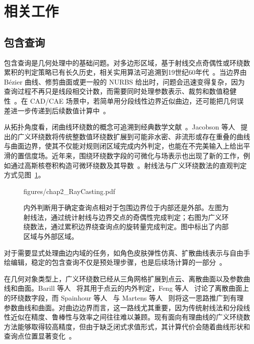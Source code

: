 \section{相关工作}\label{sec:ch2-related-work}
\subsection{包含查询}
包含查询是几何处理中的基础问题。对多边形区域，基于射线交点奇偶性或环绕数累积的判定策略已有长久历史，相关实用算法可追溯到19世纪60年代~\cite{Shimrat1962Algorithm1P,Haines1994Point,Carvalho1995}。当边界由 B\'{e}zier 曲线、修剪曲面或更一般的 NURBS 给出时，问题会迅速变得复杂，因为查询过程不再只是线段相交计数，而需要同时处理参数表示、裁剪和数值稳健性~\cite{Nishita1990RayTT,1997The,Marussig2017ARO}。在 CAD/CAE 场景中，若简单用分段线性边界近似曲边，还可能把几何误差进一步传递到后续数值计算中~\cite{Sevilla2008NURBSenhancedFE}。

从拓扑角度看，闭曲线环绕数的概念可追溯到经典数学文献~\cite{meister1771generalia}。Jacobson 等人~\cite{Jacobson2013RobustIS} 提出的广义环绕数将传统整数值环绕数扩展到可能非水密、非流形或存在重叠的曲线与曲面边界，使其不仅能对规则闭区域完成内外判定，也能在不完美输入上给出平滑的置信度场。近年来，围绕环绕数字段的可微化与场表示也出现了新的工作，例如通过高斯核卷积构造可微环绕数及其导数~\cite{Sun2024GauWNGW}。射线法与广义环绕数法的直观判定方式见图~\ref{fig:ch2-containment-query}。

\begin{figure}[t]
	\centering
	\begin{overpic}[width=0.96\linewidth,percent]{figures/chap2_RayCasting.pdf}
	\end{overpic}
	\caption{内外判断用于确定查询点相对于包围边界位于内部还是外部。左图为射线法，通过统计射线与边界交点的奇偶性完成判定；右图为广义环绕数法，通过累积边界绕查询点的旋转量完成判定。图中标出了内部区域与外部区域。}
	\label{fig:ch2-containment-query}
\end{figure}

对于需要显式处理曲边内域的任务，如角色皮肤弹性仿真、扩散曲线表示与自由手绘编辑，稳定的包含查询不仅是预处理步骤，也是后续场计算的一部分~\cite{McAdams2011EfficientEF,Orzan2013DiffusionCA,Scrivener2024WindingNF}。

在几何对象类型上，广义环绕数已经从三角网格扩展到点云、离散曲面以及参数曲线和曲面。Barill 等人~\cite{Barill2018} 将其用于点云的内外判定，Feng 等人~\cite{Feng2023WindingNO} 讨论了离散曲面上的环绕数字段，而 Spainhour 等人~\cite{Spainhour2024RobustCQ} 与 Martens 等人~\cite{Martens2024OneShotMF} 则将这一思路推广到有理参数曲线和曲面。对曲边边界而言，这一路线尤其重要，因为传统射线法和分段线性近似在精度、鲁棒性与效率之间往往难以兼顾。现有面向有理曲线的广义环绕数方法能够取得较高精度，但由于缺乏闭式求值形式，其计算代价会随着曲线形状和查询点位置显著变化~\cite{Spainhour2024RobustCQ}。

